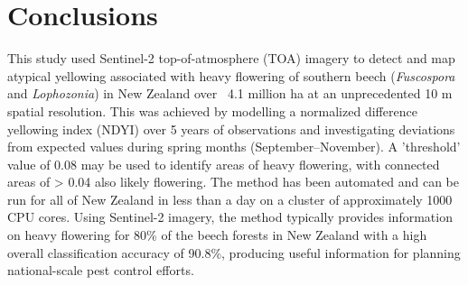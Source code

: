\documentclass[remotesensing,article,submit,moreauthors,pdftex]{Definitions/mdpi}
\begin{document}
\section{Conclusions}
This study used Sentinel-2 top-of-atmosphere (TOA) imagery to detect and map atypical yellowing associated with heavy flowering of southern beech (\emph{Fuscospora} and \emph{Lophozonia}) in New Zealand over ~4.1 million ha at an unprecedented 10 m spatial resolution. This was achieved by modelling a normalized difference yellowing index (NDYI) over 5 years of observations and investigating deviations from expected values during spring months (September--November). A 'threshold' \dndyi{} value of 0.08 may be used to identify areas of heavy flowering, with connected areas of \dndyi{} > 0.04 also likely flowering. The method has been automated and can be run for all of New Zealand in less than a day on a cluster of approximately 1000 CPU cores. Using Sentinel-2 imagery, the method typically provides information on heavy flowering for 80\% of the beech forests in New Zealand with a high overall classification accuracy of 90.8\%, producing useful information for planning national-scale pest control efforts.


\vspace{6pt} 



\end{document}
